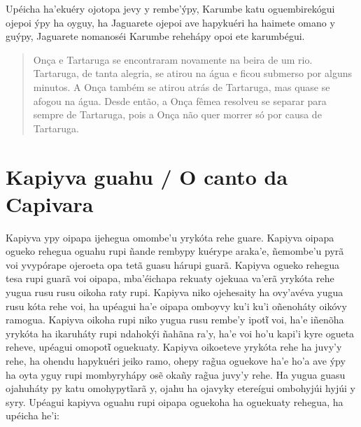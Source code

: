 \begin{itemize}

Upéicha ha'ekuéry ojotopa jevy y rembe'ýpy, Karumbe katu oguembirekógui
ojepoi ýpy ha oyguy, ha Jaguarete ojepoi ave hapykuéri ha haimete omano
y guýpy, Jaguarete nomanoséi Karumbe rehehápy opoi ete karumbégui.

\begin{quote}
Onça e Tartaruga se encontraram novamente na beira de um rio. Tartaruga,
de tanta alegria, se atirou na água e ficou submerso por alguns minutos.
A Onça também se atirou atrás de Tartaruga, mas quase se afogou na água.
Desde então, a Onça fêmea resolveu se separar para sempre de Tartaruga,
pois a Onça não quer morrer só por causa de Tartaruga.
\end{quote}

\chapter{Kapiyva guahu / O canto da Capivara}

Kapiyva ypy oipapa ijehegua omombe'u yrykóta rehe guare. Kapiyva oipapa
ogueko rehegua oguahu rupi ñande rembypy kuérype araka'e, ñemombe'u pyrã
voi yvypórape ojeroeta opa tetã guasu hárupi guarã. Kapiyva ogueko
rehegua tesa rupi guarã voi oipapa, mba'éichapa rekuaty ojekuaa va'erã
yrykóta rehe yugua rusu rusu oikoha raty rupi. Kapiyva niko ojehesaity
ha ovy'avéva yugua rusu kóta rehe voi, ha upéagui ha'e oipapa omboyvy
ku'i ku'i oñenoháty oikóvy ramogua. Kapiyva oikoha rupi niko yugua rusu
rembe'y ipotῖ voi, ha'e iñenõha yrykóta ha ikaruháty rupi ndahokýi
ñahãna ra'y, ha'e voi ho'u kapi'i kyre ogueta reheve, upéagui omopotῖ
oguekuaty. Kapiyva oikoeteve yrykóta rehe ha juvy'y rehe, ha ohendu
hapykuéri jeiko ramo, ohepy rag̃ua oguekove ha'e ho'a ave ýpy ha oyta
yguy rupi mombyryhápy osẽ okañy rag̃ua juvy'y rehe. Ha yugua guasu
ojahuháty py katu omohypytĩarã y, ojahu ha ojavyky etereígui ombohyjúi
hyjúi y syry. Upéagui kapiyva oguahu rupi oipapa oguekoha ha oguekuaty
rehegua, ha upéicha he'i:


\end{itemize}
